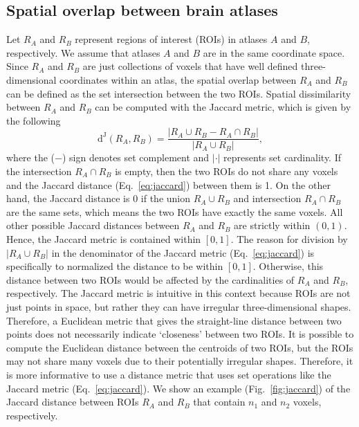 \documentclass[10pt,letterpaper]{article}\usepackage[]{graphicx}\usepackage[]{color}
\begin{document}
\subsection{Spatial overlap between brain atlases}
Let $R_A$ and $R_B$ represent regions of interest (ROIs) in atlases $A$ and $B$, respectively. We assume that atlases $A$ and $B$ are in the same coordinate space. Since $R_A$ and $R_B$ are just collections of voxels that have well defined three-dimensional coordinates within an atlas, the spatial overlap between $R_A$ and $R_B$ can be defined as the set intersection between the two ROIs. Spatial dissimilarity between $R_A$ and $R_B$ can be computed with the Jaccard metric, which is given by the following
%
\begin{equation}\label{eq:jaccard}
\text{d}^\text{J}(R_A,R_B) = \frac{|R_A \cup R_B - R_A \cap R_B|}{|R_A \cup R_B|},
\end{equation}
%
where the ($-$) sign denotes set complement and $|\cdot|$ represents set cardinality. If the intersection $R_A \cap R_B$ is empty, then the two ROIs do not share any voxels and the Jaccard distance (Eq.~\ref{eq:jaccard}) between them is 1. On the other hand, the Jaccard distance is 0 if the union $R_A \cup R_B$ and intersection $R_A \cap R_B$ are the same sets, which means the two ROIs have exactly the same voxels. All other possible Jaccard distances between $R_A$ and $R_B$ are strictly within $(0,1)$. Hence, the Jaccard metric is contained within $[0,1]$. The reason for division by $|R_A \cup R_B|$ in the denominator of the Jaccard metric (Eq.~\ref{eq:jaccard}) is specifically to normalized the distance to be within $[0,1]$. Otherwise, this distance between two ROIs would be affected by the cardinalities of $R_A$ and $R_B$, respectively. The Jaccard metric is intuitive in this context because ROIs are not just points in space, but rather they can have irregular three-dimensional shapes. Therefore, a Euclidean metric that gives the straight-line distance between two points does not necessarily indicate `closeness' between two ROIs. It is possible to compute the Euclidean distance between the centroids of two ROIs, but the ROIs may not share many voxels due to their potentially irregular shapes. Therefore, it is more informative to use a distance metric that uses set operations like the Jaccard metric (Eq.~\ref{eq:jaccard}). We show an example (Fig.~\ref{fig:jaccard}) of the Jaccard distance between ROIs $R_A$ and $R_B$ that contain $n_1$ and $n_2$ voxels, respectively. 

\vspace{0.25cm}
\end{document}
